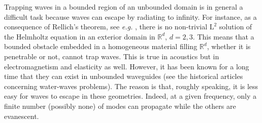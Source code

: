 \documentclass[11pt,a4paper]{article}
\newcommand{\mrm}[1]{\mathrm{#1}}
\newcommand{\R}{\mathbb{R}}
\newcommand{\mL}{\mrm{L}}
\begin{document}
Trapping waves in a bounded region of an unbounded domain is in general a difficult task because waves can escape by radiating to infinity. For instance, as a consequence of Rellich's theorem, see \textit{e.g.} \cite[Thm. 2.14]{CoKr13}, there is no non-trivial $\mL^2$ solution of the Helmholtz equation in an exterior domain in $\R^d$, $d=2,3$. This means that a bounded obstacle embedded in a homogeneous material filling $\R^d$, whether it is penetrable or not, cannot trap waves. This is true in acoustics but in electromagnetism and elasticity as well. However, it has been known for a long time that they can exist in unbounded waveguides (see the historical articles \cite{Urse51,Jone53} concerning water-waves problems). The reason is that, roughly speaking, it is less easy for waves to escape in these geometries. Indeed, at a given frequency, only a finite number (possibly none) of modes can propagate  while the others are evanescent.\\
\newline 
\end{document}
